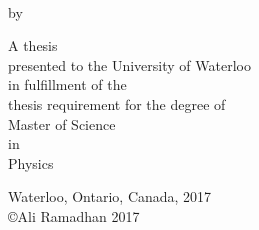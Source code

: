 \begin{titlepage}
  \begin{addmargin}[-1cm]{-3cm}
    \begin{center}
      \Large  
      
      \hfill
      
      \vfill
      
      \begingroup
      \color{Maroon}{\Large \spacedallcaps{\myTitle}} \\ \bigskip
      \endgroup
      
      by \\ \bigskip
      
      \spacedlowsmallcaps{\myName}
      
      \vfill
      
      A thesis \\
      presented to the University of Waterloo \\
      in fulfillment of the \\
      thesis requirement for the degree of \\
      Master of Science \\
      in \\
      Physics
      
      \vfill
      
      Waterloo, Ontario, Canada, 2017 \\
      \copyright Ali Ramadhan 2017
      
      \vfill
      
    \end{center}  
  \end{addmargin}       
\end{titlepage}  
